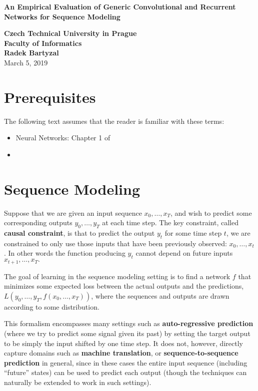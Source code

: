 \documentclass[12pt, titlepage]{article}
\author{Radek Bartyzal}
\begin{document}
\begin{titlepage}
    \centering
    \vfill
    {\bfseries\Huge
        An Empirical Evaluation of Generic Convolutional and Recurrent Networks for Sequence Modeling \\
    }    
        \vskip1cm
        
    {\bfseries\Large 
    Czech Technical University in Prague\\ 
    Faculty of Informatics\\ 
    \vskip1cm
    Radek Bartyzal\\
    }    
    \vskip1cm
    March 5, 2019
    \vfill

    \vfill
    \vfill
\end{titlepage}

\tableofcontents

\section{Prerequisites}
The following text assumes that the reader is familiar with these terms:

\begin{itemize}
\item Neural Networks: Chapter 1 of \cite{cit:nn} 
\item 
\end{itemize}

\section{Sequence Modeling}\label{sec:seq}
Suppose that we are given an input sequence $x_0, \dots , x_T$, and wish to predict some corresponding outputs $y_0, \dots , y_T$ at each time step. The key constraint, called \textbf{causal constraint}, is that to predict the output $y_t$ for some time step $t$, we are constrained to only use those inputs that have been previously observed: $x_0, \dots , x_t$. In other words the function producing $y_t$ cannot depend on future inputs $x_{t+1}, \dots, x_T.$


The goal of learning in the sequence modeling setting is to find a network $f$ that minimizes some expected loss between the actual outputs and the predictions, $L(y_0, \dots , y_T, f(x_0, \dots , x_T))$, where the sequences and outputs are drawn according to some distribution.

This formalism encompasses many settings such as \textbf{auto-regressive prediction} (where we try to predict some signal given its past) by setting the target output to be simply the input shifted by one time step. It does not, however, directly capture domains such as \textbf{machine translation}, or \textbf{sequence-to-sequence prediction} in general, since in these cases the entire input sequence (including “future” states) can be used to predict each output (though the techniques can naturally be extended to work in such settings).
\end{document}
